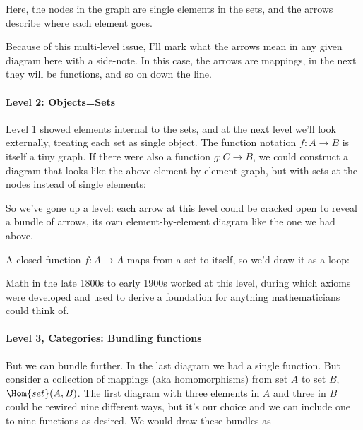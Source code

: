 \documentclass[11pt]{article}
\begin{document}
Here, the nodes in the graph are single elements in the sets, and the arrows describe
where each element goes.

Because of this multi-level issue, I'll mark what the arrows mean in any given diagram
here with a side-note. In this case, the arrows are mappings, in the next they will be
functions, and so on down the line.

\paragraph{Level 2: Objects=Sets}
Level 1 showed elements internal to the sets, and at the next level we'll look externally,
treating each set as single object.
The function notation $f:A\to B$ is itself a tiny graph. If there were also a function
$g:C\to B$, we could construct a diagram that looks like the above element-by-element
graph, but with sets at the nodes instead of single elements:

So we've gone up a level: each arrow at this level could be cracked open to reveal
a bundle of arrows, its own element-by-element diagram like the one we had above.

A closed function $f:A\to A$ maps from a set to itself, so we'd draw it as a loop:


Math in the late 1800s to early 1900s worked at this level, during which axioms
were developed and used to derive a foundation for anything mathematicians could think of.

\paragraph{Level 3, Categories: Bundling functions}
But we can bundle further. In the last
diagram we had a single function. But consider a collection of mappings (aka homomorphisms)
from set $A$ to set $B$, $\Hom{set}(A, B)$.
The first diagram with three elements in $A$ and
three in $B$ could be rewired nine different ways, but it's our choice and we can include
one to nine functions as desired.  We would draw these
bundles as
\end{document}
